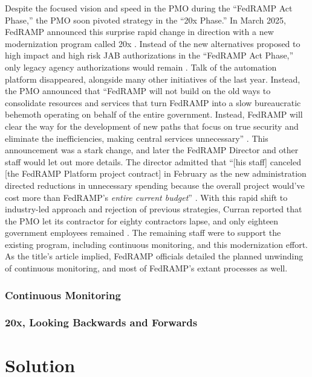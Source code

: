 \documentclass{jdf}
\begin{document}
Despite the focused vision and speed in the PMO during the ``FedRAMP Act Phase,'' the PMO soon pivoted strategy in the ``20x Phase.'' In March 2025, FedRAMP announced this surprise rapid change in direction with a new modernization program called 20x \citeyear{fedramp_blog_20x}. Instead of the new alternatives proposed to high impact and high risk JAB authorizations in the ``FedRAMP Act Phase,'' only legacy agency authorizations would remain \citeyear{fedramp_blog_20x}. Talk of the automation platform disappeared, alongside many other initiatives of the last year. Instead, the PMO announced that ``FedRAMP will not build on the old ways to consolidate resources and services that turn FedRAMP into a slow bureaucratic behemoth operating on behalf of the entire government. Instead, FedRAMP will clear the way for the development of new paths that focus on true security and eliminate the inefficiencies, making central services unnecessary'' \citeyear{fedramp_blog_20x}. This announcement was a stark change, and later the FedRAMP Director and other staff would let out more details. The director admitted that ``[his staff] canceled [the FedRAMP Platform project contract] in February as the new administration directed reductions in unnecessary spending because the overall project would've cost more than FedRAMP's \textit{entire current budget}'' \citeyear{20x_waterman_platform_comment}. With this rapid shift to industry-led approach and rejection of previous strategies, Curran reported that the PMO let its contractor for eighty contractors lapse, and only eighteen government employees remained \citeyear{curran25}. The remaining staff were to support the existing program, including continuous monitoring, and this modernization effort. As the title's article implied, FedRAMP officials detailed the planned unwinding of continuous monitoring, and most of FedRAMP's extant processes as well.

\subsubsection{Continuous Monitoring} \label{conmon}


\subsubsection{20x, Looking Backwards and Forwards}

\section{Solution}
\end{document}
